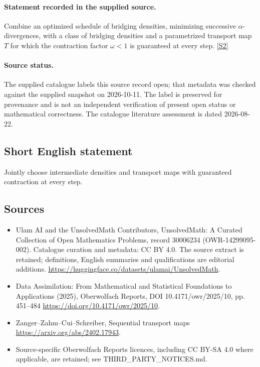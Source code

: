 \documentclass[11pt]{article}
\begin{document}
\paragraph{Statement recorded in the supplied source.}
Combine an optimized schedule of bridging densities, minimizing successive $\alpha$-divergences, with a class of bridging densities and a parametrized transport map $T$ for which the contraction factor $\omega<1$ is guaranteed at every step. \href{https://doi.org/10.4171/owr/2025/10}{[S2]}
\paragraph{Source status.}
The supplied catalogue labels this source record open; that metadata was checked against the supplied snapshot on 2026-10-11. The label is preserved for provenance and is not an independent verification of present open status or mathematical correctness. The catalogue literature assessment is dated 2026-08-22.
\subsection{Short English statement}
Jointly choose intermediate densities and transport maps with guaranteed contraction at every step.
\subsection{Sources}
\begin{itemize}
\item[S1] Ulam AI and the UnsolvedMath Contributors, UnsolvedMath: A Curated Collection of Open Mathematics Problems, record 30006234 (OWR-14299095-002). Catalogue curation and metadata: CC BY 4.0. The source extract is retained; definitions, English summaries and qualifications are editorial additions.
\url{https://huggingface.co/datasets/ulamai/UnsolvedMath}.
\item[S2] Data Assimilation: From Mathematical and Statistical Foundations to Applications (2025), Oberwolfach Reports, DOI 10.4171/owr/2025/10, pp. 451--484
\url{https://doi.org/10.4171/owr/2025/10}.
\item[S3] Zanger--Zahm--Cui--Schreiber, Sequential transport maps
\url{https://arxiv.org/abs/2402.17943}.
\item Source-specific Oberwolfach Reports licences, including CC BY-SA 4.0 where applicable, are retained; see THIRD\_PARTY\_NOTICES.md.
\end{itemize}
\end{document}
